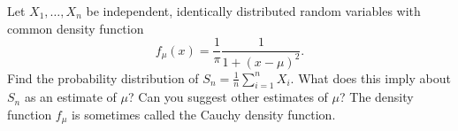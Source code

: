 Let $X_1, \ldots, X_n$ be independent, identically distributed random variables with common density function
$$f_\mu(x) = \frac{1}{\pi} \frac{1}{1 + (x - \mu)^2}.$$
Find the probability distribution of $S_n = \frac{1}{n} \sum_{i=1}^{n} X_i$. What does this imply about $S_n$ as an estimate of $\mu$? Can you suggest other estimates of $\mu$? The density function $f_\mu$ is sometimes called the Cauchy density function.
